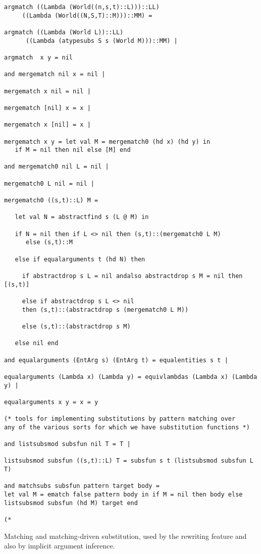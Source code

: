 \documentclass{article}
\begin{document}
\begin{verbatim}
argmatch ((Lambda (World((n,s,t)::L)))::LL) 
     ((Lambda (World((N,S,T)::M)))::MM) =

argmatch ((Lambda (World L))::LL)
      ((Lambda (atypesubs S s (World M)))::MM) |

argmatch  x y = nil

and mergematch nil x = nil |

mergematch x nil = nil |

mergematch [nil] x = x |

mergematch x [nil] = x |

mergematch x y = let val M = mergematch0 (hd x) (hd y) in
   if M = nil then nil else [M] end

and mergematch0 nil L = nil |

mergematch0 L nil = nil |

mergematch0 ((s,t)::L) M = 

   let val N = abstractfind s (L @ M) in

   if N = nil then if L <> nil then (s,t)::(mergematch0 L M)
      else (s,t)::M

   else if equalarguments t (hd N) then

     if abstractdrop s L = nil andalso abstractdrop s M = nil then [(s,t)]

     else if abstractdrop s L <> nil
     then (s,t)::(abstractdrop s (mergematch0 L M))

     else (s,t)::(abstractdrop s M)

   else nil end

and equalarguments (EntArg s) (EntArg t) = equalentities s t |

equalarguments (Lambda x) (Lambda y) = equivlambdas (Lambda x) (Lambda y) |

equalarguments x y = x = y

(* tools for implementing substitutions by pattern matching over
any of the various sorts for which we have substitution functions *)

and listsubsmod subsfun nil T = T |

listsubsmod subsfun ((s,t)::L) T = subsfun s t (listsubsmod subsfun L T)

and matchsubs subsfun pattern target body = 
let val M = ematch false pattern body in if M = nil then body else
listsubsmod subsfun (hd M) target end

(*

\end{verbatim}

Matching and matching-driven substitution, used by the rewriting feature and also by implicit argument inference.
\end{document}
